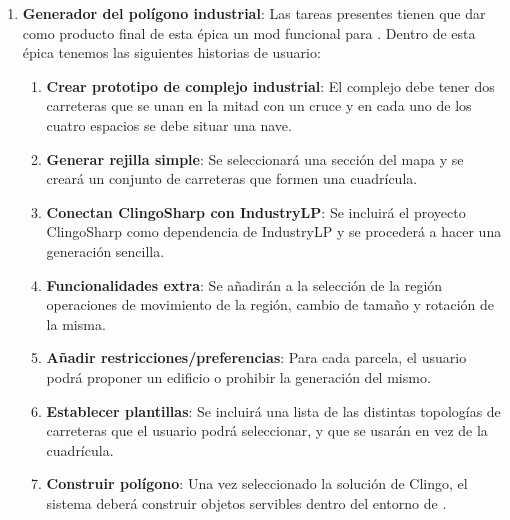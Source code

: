 \begin{enumerate}
	\item \textbf{Generador del polígono industrial}: Las tareas presentes tienen que dar como producto final de esta épica un mod funcional para \cities. Dentro de esta épica tenemos las siguientes historias de usuario:
	\begin{enumerate}[label={\arabic*.}]
		\item \textbf{Crear prototipo de complejo industrial}: El complejo debe tener dos carreteras que se unan en la mitad con un cruce y en cada uno de los cuatro espacios se debe situar una nave.
		\item \textbf{Generar rejilla simple}: Se seleccionará una sección del mapa y se creará un conjunto de carreteras que formen una cuadrícula.
		\item \textbf{Conectan ClingoSharp con IndustryLP}: Se incluirá el proyecto ClingoSharp como dependencia de IndustryLP y se procederá a hacer una generación sencilla.
		\item \textbf{Funcionalidades extra}: Se añadirán a la selección de la región operaciones de movimiento de la región, cambio de tamaño y rotación de la misma.
		\item \textbf{Añadir restricciones/preferencias}: Para cada parcela, el usuario podrá proponer un edificio o prohibir la generación del mismo.
		\item \textbf{Establecer plantillas}: Se incluirá una lista de las distintas topologías de carreteras que el usuario podrá seleccionar, y que se usarán en vez de la cuadrícula.
		\item \textbf{Construir polígono}: Una vez seleccionado la solución de Clingo, el sistema deberá construir objetos servibles dentro del entorno de \cities.
	\end{enumerate}


\end{enumerate}
